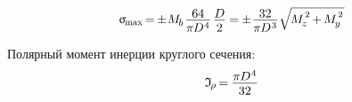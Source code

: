 \documentclass[14pt]{extarticle}
\begin{document}
\[
\upsigma_{\hspace{-0.2ex}\scalebox{.75}{max}} \hspace{-.25ex}
= \hspace{-.2ex} \pm \hspace{.1ex} M_{\hspace{-0.1ex}\scalebox{.8}{$b$}} \hspace{.2ex}
\displaystyle\frac{\raisebox{-.2em}{$64$}}{\pi \hspace{-0.1ex} D^{\hspace{.1ex}4}} \hspace{.25ex} \displaystyle\frac{\raisebox{-.2em}{$D$}}{2}
\hspace{-.1ex}= \hspace{-.1ex}
\pm \hspace{.1ex} \displaystyle\frac{\raisebox{-.2em}{$32$}}{\pi \hspace{-0.1ex} D^{\hspace{.1ex}3}} \hspace{.1ex}
\sqrt{\hspace{-0.2ex}M_{\hspace{-0.1ex}\scalebox{.8}{$z$}}^{\hspace{.2ex}\raisebox{.2em}{$\scriptstyle 2$}} \hspace{-0.2ex}+\hspace{-0.2ex} M_{\hspace{-0.1ex}\scalebox{.8}{$y$}}^{\hspace{.2ex}\raisebox{.2em}{$\scriptstyle 2$}}\hspace{.2ex}}
\]

Полярный момент инерции круглого сечения:
\[
\mathfrak{I}_{\hspace{-0.2ex}\scalebox{.8}{$\rho$}} \hspace{-0.25ex}=\hspace{-0.1ex}
\displaystyle\frac{\raisebox{-0.18em}{$\pi \hspace{-0.1ex} D^{\hspace{.1ex}4}$}}{32}
\]
\end{document}
